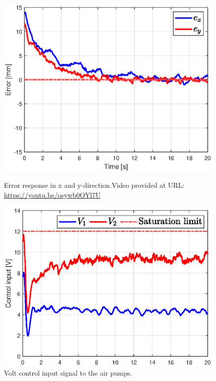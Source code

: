\begin{figure}[H] 
    \begin{minipage}[b]{0.49\linewidth}
     \centering
    \includegraphics[width=\linewidth]{Figures/Chapter5/errorstepright.eps} 
    \caption{Error response in x and y-direction.Video provided at URL: \url{https://youtu.be/osywb0OYl7U}} 
    \label{fig5:errorswingright} 
       \end{minipage} 
    \begin{minipage}[b]{0.49\linewidth}
     \centering
    \includegraphics[width=\linewidth]{Figures/Chapter5/controlinputsteprightV.eps} 
    \caption{Volt control input signal to the air pumps.} 
    \label{fig5:inputswingright} 
    \end{minipage} 
\end{figure}

